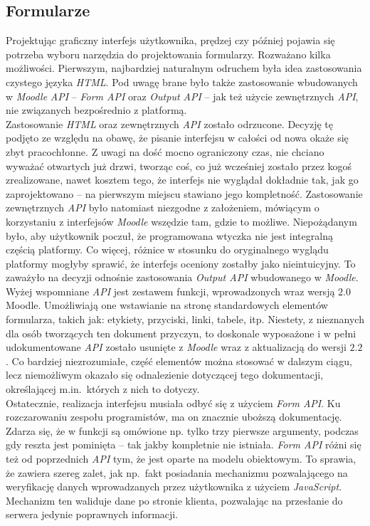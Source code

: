 \subsection{Formularze}
\label{Chapter625}

Projektując graficzny interfejs użytkownika, prędzej czy później pojawia się potrzeba wyboru narzędzia do projektowania formularzy. Rozważano kilka możliwości. Pierwszym, najbardziej naturalnym odruchem była idea zastosowania czystego języka \textit{HTML}. Pod uwagę brane było także zastosowanie wbudowanych w \textit{Moodle} \textit{API} -- \textit{Form API} oraz \textit{Output API} -- jak też użycie zewnętrznych \textit{API}, nie związanych bezpośrednio z platformą. \\

Zastosowanie \textit{HTML} oraz zewnętrznych \textit{API} zostało odrzucone. Decyzję tę podjęto ze względu na obawę, że pisanie interfejsu w całości od nowa okaże się zbyt pracochłonne. Z uwagi na dość mocno ograniczony czas, nie chciano wyważać otwartych już drzwi, tworząc coś, co już wcześniej zostało przez kogoś zrealizowane, nawet kosztem tego, że interfejs nie wyglądał dokładnie tak, jak go zaprojektowano -- na pierwszym miejscu stawiano jego kompletność. Zastosowanie zewnętrznych \textit{API} było natomiast niezgodne z założeniem, mówiącym o korzystaniu z interfejsów \textit{Moodle} wszędzie tam, gdzie to możliwe. Niepożądanym było, aby użytkownik poczuł, że programowana wtyczka nie jest integralną częścią platformy. Co więcej, różnice w stosunku do oryginalnego wyglądu platformy mogłyby sprawić, że interfejs oceniony zostałby jako nieintuicyjny. To zaważyło na decyzji odnośnie zastosowania \textit{Output API} wbudowanego w \textit{Moodle}. \\

Wyżej wspomniane \textit{API} jest zestawem funkcji, wprowadzonych wraz wersją $2.0$ Moodle. Umożliwiają one wstawianie na stronę standardowych elementów formularza, takich jak: etykiety, przyciski, linki, tabele, itp. Niestety, z nieznanych dla osób tworzących ten dokument przyczyn, to doskonale wyposażone i w pełni udokumentowane \textit{API} zostało usunięte z \textit{Moodle} wraz z aktualizacją do wersji $2.2$. Co bardziej niezrozumiałe, część elementów można stosować w dalszym ciągu, lecz niemożliwym okazało się odnalezienie dotyczącej tego dokumentacji, określającej m.in.~których z nich to dotyczy. \\

Ostatecznie, realizacja interfejsu musiała odbyć się z użyciem \textit{Form API}. Ku rozczarowaniu zespołu programistów, ma on znacznie uboższą dokumentację. Zdarza się, że w funkcji są omówione np. tylko trzy pierwsze argumenty, podczas gdy reszta jest pominięta -- tak jakby kompletnie nie istniała. \textit{Form API} różni się też od poprzednich \textit{API} tym, że jest oparte na modelu obiektowym. To sprawia, że zawiera szereg zalet, jak np.~fakt posiadania mechanizmu pozwalającego na weryfikację danych wprowadzanych przez użytkownika z użyciem \textit{JavaScript}. Mechanizm ten waliduje dane po stronie klienta, pozwalając na przesłanie do serwera jedynie poprawnych informacji. \\

